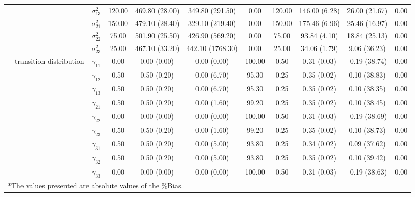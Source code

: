 \begin{table}[h]
{\begin{tabular}{ccccccccccc}
 &  & $\sigma^2_{13}$ & 120.00 & 469.80 (28.00) & 349.80 (291.50) & 0.00 & 120.00 & 146.00 (6.28) & 26.00 (21.67) & 0.00 \\
 &  & $\sigma^2_{21}$ & 150.00 & 479.10 (28.40) & 329.10 (219.40) & 0.00 & 150.00 & 175.46 (6.96) & 25.46 (16.97) & 0.00 \\
 &  & $\sigma^2_{22}$ & 75.00 & 501.90 (25.50) & 426.90 (569.20) & 0.00 & 75.00 & 93.84 (4.10) & 18.84 (25.13) & 0.00 \\
 &  & $\sigma^2_{23}$ & 25.00 & 467.10 (33.20) & 442.10 (1768.30) & 0.00 & 25.00 & 34.06 (1.79) & 9.06 (36.23) & 0.00 \\
 & transition distribution & $\gamma_{11}$ & 0.00 & 0.00 (0.00) & 0.00 (0.00) & 100.00 & 0.50 & 0.31 (0.03) & -0.19 (38.74) & 0.00 \\
 & \multirow{8}{*}{} & $\gamma_{12}$ & 0.50 & 0.50 (0.20) & 0.00 (6.70) & 95.30 & 0.25 & 0.35 (0.02) & 0.10 (38.83) & 0.00 \\
 &  & $\gamma_{13}$ & 0.50 & 0.50 (0.20) & 0.00 (6.70) & 95.30 & 0.25 & 0.35 (0.02) & 0.10 (38.35) & 0.00 \\
 &  & $\gamma_{21}$ & 0.50 & 0.50 (0.20) & 0.00 (1.60) & 99.20 & 0.25 & 0.35 (0.02) & 0.10 (38.45) & 0.00 \\
 &  & $\gamma_{22}$ & 0.00 & 0.00 (0.00) & 0.00 (0.00) & 100.00 & 0.50 & 0.31 (0.03) & -0.19 (38.69) & 0.00 \\
 &  & $\gamma_{23}$ & 0.50 & 0.50 (0.20) & 0.00 (1.60) & 99.20 & 0.25 & 0.35 (0.02) & 0.10 (38.73) & 0.00 \\
 &  & $\gamma_{31}$ & 0.50 & 0.50 (0.20) & 0.00 (5.00) & 93.80 & 0.25 & 0.34 (0.02) & 0.09 (37.62) & 0.00 \\
 &  & $\gamma_{32}$ & 0.50 & 0.50 (0.20) & 0.00 (5.00) & 93.80 & 0.25 & 0.35 (0.02) & 0.10 (39.42) & 0.00 \\
 &  & $\gamma_{33}$ & 0.00 & 0.00 (0.00) & 0.00 (0.00) & 100.00 & 0.50 & 0.31 (0.03) & -0.19 (38.63) & 0.00 \\
\bottomrule
\multicolumn{10}{l}{*The values presented are absolute values of the \%Bias.}
\end{tabular}}
\label{tgr2_1}
\end{table}


